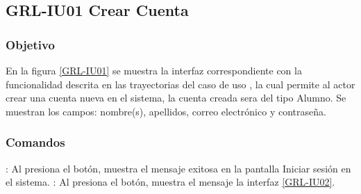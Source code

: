 \clearpage
\subsection{GRL-IU01 Crear Cuenta}

\subsubsection{Objetivo}
En la figura \ref{GRL-IU01} se muestra la interfaz correspondiente con la funcionalidad descrita en las
trayectorias del caso de uso  , la cual permite al actor crear una cuenta nueva en el sistema, 
la cuenta creada sera del tipo Alumno.
Se muestran los campos: nombre(s), apellidos, correo electrónico y contraseña.

\subsubsection{Comandos}


\Titem {} : Al presiona el botón, muestra el mensaje  exitosa en la
pantalla Iniciar sesión en el sistema.
\Titem {} : Al presiona el botón, muestra el mensaje la interfaz \ref{GRL-IU02}.



\clearpage
